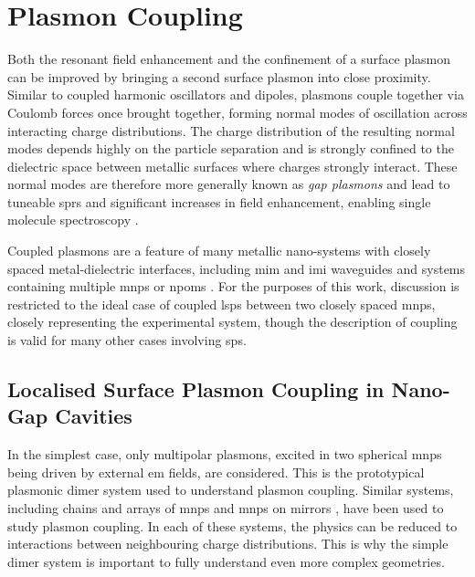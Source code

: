 \documentclass{article}
\begin{document}
\section{Plasmon Coupling}

Both the resonant field enhancement and the confinement of a surface plasmon can be improved by bringing a second surface plasmon into close proximity. Similar to coupled harmonic oscillators and dipoles, plasmons couple together via Coulomb forces once brought together, forming normal modes of oscillation across interacting charge distributions. The charge distribution of the resulting normal modes depends highly on the particle separation and is strongly confined to the dielectric space between metallic surfaces where charges strongly interact. These normal modes are therefore more generally known as \emph{gap plasmons} and lead to tuneable \glspl{spr} \cite{huang2010, millyard2012} and significant increases in field enhancement, enabling single molecule spectroscopy \cite{mertens2013, taylor2014}.

Coupled plasmons are a feature of many metallic nano-systems with closely spaced metal-dielectric interfaces, including \gls{mim} and \gls{imi} waveguides \cite{maier2007plasmonics, lindquist2013} and systems containing multiple \glspl{mnp} \cite{maier2002, atay2004, muskens2007, huang2010, millyard2012, taylor2011, herrmann2013} or \glspl{npom} \cite{okamoto2003, daniels2005, kinnan2007, mubeen2012, mertens2013, denijs2014}. For the purposes of this work, discussion is restricted to the ideal case of coupled \glspl{lsp} between two closely spaced \glspl{mnp}, closely representing the experimental system, though the description of coupling is valid for many other cases involving \glspl{sp}.

\subsection{Localised Surface Plasmon Coupling in Nano-Gap Cavities}

In the simplest case, only multipolar plasmons, excited in two spherical \glspl{mnp} being driven by external \gls{em} fields, are considered. This is the prototypical plasmonic dimer system used to understand plasmon coupling. Similar systems, including chains and arrays of \glspl{mnp} \cite{maier2002, muskens2007, millyard2012} and \glspl{mnp} on mirrors \cite{okamoto2003, daniels2005, kinnan2007, mubeen2012, mertens2013, denijs2014}, have been used to study plasmon coupling. In each of these systems, the physics can be reduced to interactions between neighbouring charge distributions. This is why the simple dimer system is important to fully understand even more complex geometries.
\end{document}
